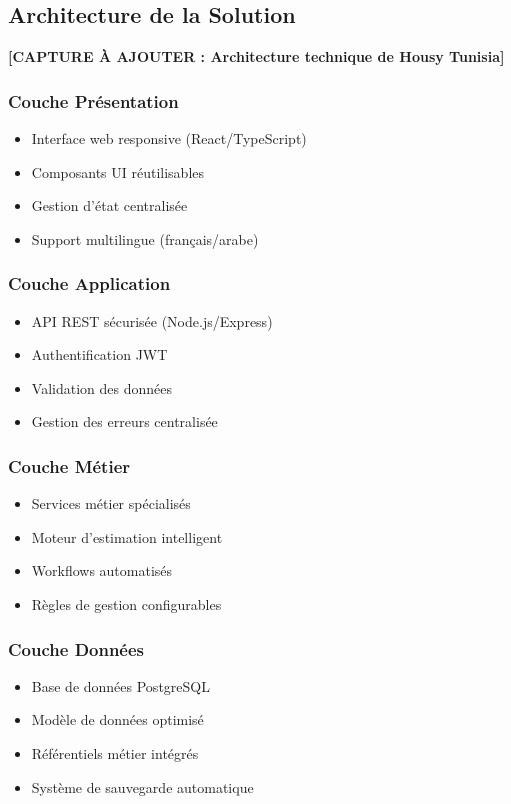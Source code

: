 \subsection{Architecture de la Solution}

\textbf{[CAPTURE À AJOUTER : Architecture technique de Housy Tunisia]}

\subsubsection{Couche Présentation}
\begin{itemize}
    \item Interface web responsive (React/TypeScript)
    \item Composants UI réutilisables
    \item Gestion d'état centralisée
    \item Support multilingue (français/arabe)
\end{itemize}

\subsubsection{Couche Application}
\begin{itemize}
    \item API REST sécurisée (Node.js/Express)
    \item Authentification JWT
    \item Validation des données
    \item Gestion des erreurs centralisée
\end{itemize}

\subsubsection{Couche Métier}
\begin{itemize}
    \item Services métier spécialisés
    \item Moteur d'estimation intelligent
    \item Workflows automatisés
    \item Règles de gestion configurables
\end{itemize}

\subsubsection{Couche Données}
\begin{itemize}
    \item Base de données PostgreSQL
    \item Modèle de données optimisé
    \item Référentiels métier intégrés
    \item Système de sauvegarde automatique
\end{itemize}

